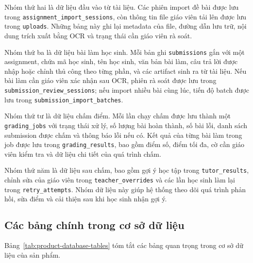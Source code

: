 \documentclass[12pt,a4paper]{article}
\begin{document}
Nhóm thứ hai là dữ liệu đầu vào từ tài liệu. Các phiên import đề bài được lưu
trong \texttt{assignment\_import\_sessions}, còn thông tin file giáo viên tải lên
được lưu trong \texttt{uploads}. Những bảng này ghi lại metadata của file, đường
dẫn lưu trữ, nội dung trích xuất bằng OCR và trạng thái cần giáo viên rà soát.

Nhóm thứ ba là dữ liệu bài làm học sinh. Mỗi bản ghi \texttt{submissions} gắn
với một assignment, chứa mã học sinh, tên học sinh, văn bản bài làm, câu trả lời
được nhập hoặc chỉnh thủ công theo từng phần, và các artifact sinh ra từ tài
liệu. Nếu bài làm cần giáo viên xác nhận sau OCR, phiên rà soát được lưu trong
\texttt{submission\_review\_sessions}; nếu import nhiều bài cùng lúc, tiến độ
batch được lưu trong \texttt{submission\_import\_batches}.

Nhóm thứ tư là dữ liệu chấm điểm. Mỗi lần chạy chấm được lưu thành một
\texttt{grading\_jobs} với trạng thái xử lý, số lượng bài hoàn thành, số bài lỗi,
danh sách submission được chấm và thông báo lỗi nếu có. Kết quả của từng bài
làm trong job được lưu trong \texttt{grading\_results}, bao gồm điểm số, điểm
tối đa, cờ cần giáo viên kiểm tra và dữ liệu chi tiết của quá trình chấm.

Nhóm thứ năm là dữ liệu sau chấm, bao gồm gợi ý học tập trong
\texttt{tutor\_results}, chỉnh sửa của giáo viên trong
\texttt{teacher\_overrides} và các lần học sinh làm lại trong
\texttt{retry\_attempts}. Nhóm dữ liệu này giúp hệ thống theo dõi quá trình phản
hồi, sửa điểm và cải thiện sau khi học sinh nhận gợi ý.

\subsection{Các bảng chính trong cơ sở dữ liệu}

Bảng~\ref{tab:product-database-tables} tóm tắt các bảng quan trọng trong cơ sở
dữ liệu của sản phẩm.
\end{document}
